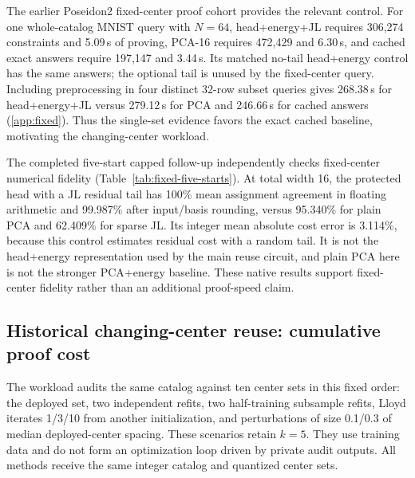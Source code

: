 The earlier Poseidon2 fixed-center proof cohort provides the relevant control. For one whole-catalog MNIST query with $N=64$, head+energy+JL requires 306,274 constraints and 5.09\,s of proving, PCA-16 requires 472,429 and 6.30\,s, and cached exact answers require 197,147 and 3.44\,s. Its matched no-tail head+energy control has the same answers; the optional tail is unused by the fixed-center query. Including preprocessing in four distinct 32-row subset queries gives 268.38\,s for head+energy+JL versus 279.12\,s for PCA and 246.66\,s for cached answers (\ref{app:fixed}). Thus the single-set evidence favors the exact cached baseline, motivating the changing-center workload.

The completed five-start capped follow-up independently checks fixed-center numerical fidelity (Table~\ref{tab:fixed-five-starts}). At total width 16, the protected head with a JL residual tail has 100\% mean assignment agreement in floating arithmetic and 99.987\% after input/basis rounding, versus 95.340\% for plain PCA and 62.409\% for sparse JL. Its integer mean absolute cost error is 3.114\%, because this control estimates residual cost with a random tail. It is not the head+energy representation used by the main reuse circuit, and plain PCA here is not the stronger PCA+energy baseline. These native results support fixed-center fidelity rather than an additional proof-speed claim.


\subsection{Historical changing-center reuse: cumulative proof cost}
The workload audits the same catalog against ten center sets in this fixed order: the deployed set, two independent refits, two half-training subsample refits, Lloyd iterates 1/3/10 from another initialization, and perturbations of size 0.1/0.3 of median deployed-center spacing. These scenarios retain $k=5$. They use training data and do not form an optimization loop driven by private audit outputs. All methods receive the same integer catalog and quantized center sets.

